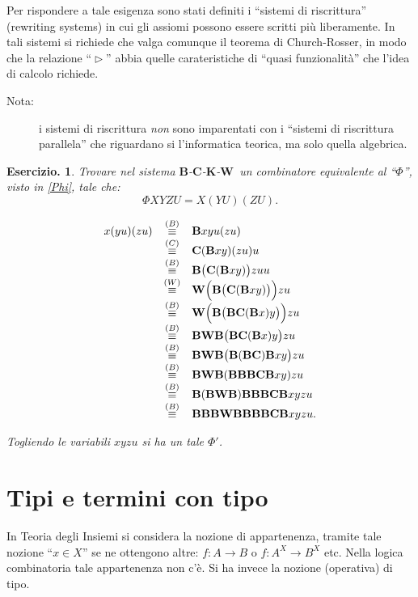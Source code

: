 \documentclass{book}
\newtheorem{ese}{Esercizio.}
\newcommand*{\KK}{$\mathbf{K}$}    %
\newcommand*{\CC}{$\mathbf{C}$}    %
\newcommand*{\BB}{$\mathbf{B}$}    %
\newcommand*{\WW}{$\mathbf{W}$}    %
\newcommand*{\cc}{\mathbf{C}}    %
\newcommand*{\bb}{\mathbf{B}}    %
\newcommand*{\ww}{\mathbf{W}}    %
\begin{document}
Per rispondere a tale esigenza sono stati definiti i ``sistemi di riscrittura''
(rewriting systems) in cui gli assiomi possono essere scritti pi\`u 
liberamente.
In tali sistemi si richiede che valga comunque il teorema di Church-Rosser, in
modo che la relazione ``$\vartriangleright$'' abbia quelle carateristiche di
``quasi funzionalit\`a'' che l'idea di calcolo richiede.
\begin{description}
\item[Nota:]i sistemi di riscrittura \emph{non} sono imparentati con i 
``sistemi di riscrittura  parallela'' che riguardano si l'informatica teorica, 
ma solo quella algebrica.
\end{description}

\begin{ese}
Trovare nel sistema \BB-\CC-\KK-\WW~un combinatore equivalente al ``$\Phi$'',
visto in \ref{Phi}, tale che:
\[
\Phi XYZU = X(YU)(ZU).
\]

\[
\begin{array}{lcl}
x(yu)(zu) & \stackrel{(B)}{\equiv} & \bb xyu(zu) \\
          & \stackrel{(C)}{\equiv} & \cc (\bb xy)(zu)u \\
          & \stackrel{(B)}{\equiv} & \bb \bigl(\cc (\bb xy)\bigr)zuu \\
          & \stackrel{(W)}{\equiv} & \ww \Bigl(\bb\bigl(\cc(\bb xy)\bigr)\Bigr)
                                     zu \\
          & \stackrel{(B)}{\equiv} & \ww\Bigl(\bb\bigl(\bb\cc(\bb x)y\bigr)
                                     \Bigr)zu \\
          & \stackrel{(B)}{\equiv} & \bb\ww\bb\bigl(\bb\cc(\bb x)y\bigr)zu \\
          & \stackrel{(B)}{\equiv} & \bb\ww\bb\bigl(\bb(\bb\cc)\bb xy\bigr)zu 
                                     \\
          & \stackrel{(B)}{\equiv} & \bb\ww\bb(\bb\bb\bb\cc\bb xy)zu \\
          & \stackrel{(B)}{\equiv} & \bb(\bb\ww\bb)\bb\bb\bb\cc\bb xyzu \\
          & \stackrel{(B)}{\equiv} & \bb\bb\bb\ww\bb\bb\bb\bb\cc\bb xyzu. \\
\end{array}
\]

Togliendo le variabili $xyzu$ si ha un tale $\Phi '$.
\end{ese}

\chapter{Tipi e termini con tipo}
In Teoria degli Insiemi si considera la nozione di appartenenza, tramite tale 
nozione ``$x \in X$'' se ne ottengono altre: $f\colon A \to B$ o $f\colon A^X
\to B^X$ etc. Nella logica combinatoria tale appartenenza non c'\`e. Si ha 
invece la nozione (operativa) di tipo.
\end{document}
